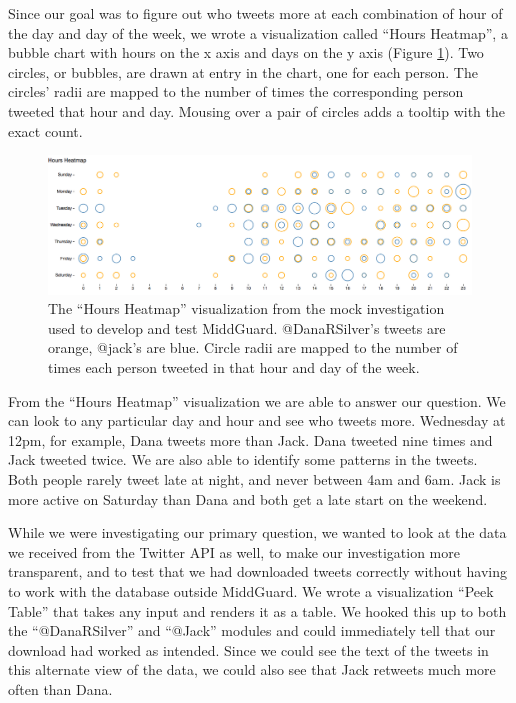 \documentclass[midd]{thesis}
\begin{document}
Since our goal was to figure out who tweets more at each combination of hour of
the day and day of the week, we wrote a visualization called ``Hours Heatmap'',
a bubble chart with hours on the x axis and days on the y axis (Figure
\ref{fig:punchcard}). Two circles, or bubbles, are drawn at entry in the chart,
one for each person. The circles' radii are mapped to the number of times the
corresponding person tweeted that hour and day. Mousing over a pair of circles
adds a tooltip with the exact count.

\begin{figure}[!ht]
  \centering
  \includegraphics[width=1\textwidth]{punchcard}
  \caption[A visualization rendered in the browser.]{The ``Hours Heatmap''
  visualization from the mock investigation used to develop and test MiddGuard.
  @DanaRSilver's tweets are orange, @jack's are blue. Circle radii are mapped to
  the number of times each person tweeted in that hour and day of the week.}
  \label{fig:punchcard}
\end{figure}

From the ``Hours Heatmap'' visualization we are able to answer our question. We
can look to any particular day and hour and see who tweets more. Wednesday at
12pm, for example, Dana tweets more than Jack. Dana tweeted nine times and Jack
tweeted twice. We are also able to identify some patterns in the tweets. Both
people rarely tweet late at night, and never between 4am and 6am. Jack is more
active on Saturday than Dana and both get a late start on the weekend.

While we were investigating our primary question, we wanted to look at the data
we received from the Twitter API as well, to make our investigation more
transparent, and to test that we had downloaded tweets correctly without having
to work with the database outside MiddGuard. We wrote a visualization ``Peek
Table'' that takes any input and renders it as a table. We hooked this up to
both the ``@DanaRSilver'' and ``@Jack'' modules and could immediately tell that
our download had worked as intended. Since we could see the text of the tweets
in this alternate view of the data, we could also see that Jack retweets much
more often than Dana.
\end{document}
